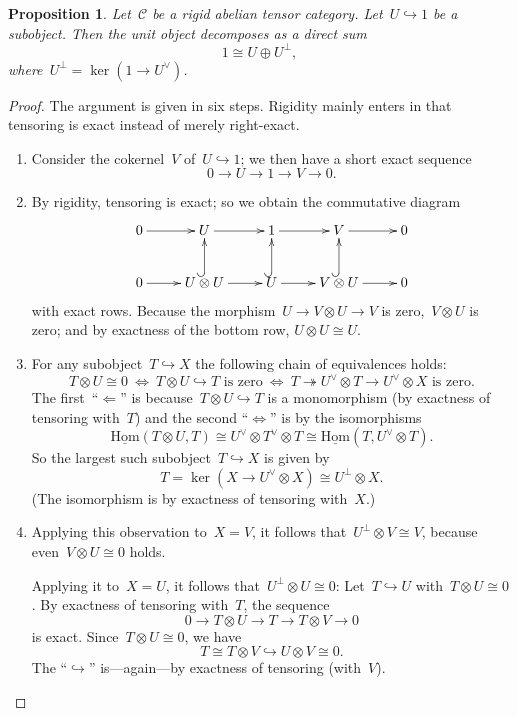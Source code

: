 \documentclass[a4paper,english,12pt]{scrartcl}
\theoremstyle{definition}
\theoremstyle{plain}
\newtheorem{prop}[defn]{Proposition}
\theoremstyle{remark}
\newcommand{\C}{\mathcal{C}}
\renewcommand{\_}{\mathpunct{.}\,}
\newcommand{\?}{\,{:}\,}
\newcommand{\Hom}{\underline{\mathrm{Hom}}}
\begin{document}
\begin{prop}Let~$\C$ be a rigid abelian tensor category. Let~$U \hookrightarrow
1$ be a subobject. Then the unit object decomposes as a direct sum
\[ 1 \cong U \oplus U^\perp, \]
where~$U^\perp = \ker(1 \to U^\vee)$.\end{prop}
\begin{proof}The argument is given in six steps. Rigidity mainly enters in that
tensoring is exact instead of merely right-exact.\begin{enumerate}
\item Consider the cokernel~$V$ of~$U \hookrightarrow 1$; we then have a short
exact sequence
\[ 0 \longrightarrow U \longrightarrow 1 \longrightarrow V \longrightarrow 0.
\]
\item By rigidity, tensoring is exact; so we obtain the commutative diagram
\[ \xymatrix{
  0 \ar[r] & U \ar[r] & 1 \ar[r] & V \ar[r] & 0 \\
  0 \ar[r] & U \otimes U \ar[r] \ar@{^{(}->}[u] & U \ar[r] \ar@{^{(}->}[u] & V \otimes U \ar[r]
  \ar@{^{(}->}[u] & 0
} \]
with exact rows. Because the morphism~$U \to V \otimes U \to V$ is zero,~$V
\otimes U$ is zero; and by exactness of the bottom row, $U \otimes U \cong U$.
\item For any subobject~$T \hookrightarrow X$ the following chain of
equivalences holds:
\[ T \otimes U \cong 0
  \ \Longleftrightarrow\ 
  \text{$T \otimes U \hookrightarrow T$ is zero}
  \ \Longleftrightarrow\ 
  \text{$T \twoheadrightarrow U^\vee \otimes T \to U^\vee \otimes X$ is zero}.
  \]
The first~``$\Leftarrow$'' is because~$T \otimes U \hookrightarrow T$ is a
monomorphism (by exactness of tensoring with~$T$) and the second
``$\Leftrightarrow$'' is by the isomorphisms
\[ \Hom(T \otimes U, T) \cong U^\vee \otimes T^\vee \otimes T \cong
  \Hom(T, U^\vee \otimes T). \]
So the largest such subobject~$T \hookrightarrow X$ is given by
\[ T = \ker(X \to U^\vee \otimes X) \cong U^\perp \otimes X. \]
(The isomorphism is by exactness of tensoring with~$X$.)
\item Applying this observation to~$X = V$, it follows that~$U^\perp \otimes V
\cong V$, because even~$V \otimes U \cong 0$ holds.

Applying it to~$X = U$, it follows that~$U^\perp \otimes U \cong 0$: Let~$T
\hookrightarrow U$ with~$T \otimes U \cong 0$. By exactness of tensoring
with~$T$, the sequence
\[ 0 \longrightarrow T \otimes U \longrightarrow T \longrightarrow T \otimes V
\longrightarrow 0 \]
is exact. Since~$T \otimes U \cong 0$, we have
\[ T \cong T \otimes V \hookrightarrow U \otimes V \cong 0. \]
The ``$\hookrightarrow$'' is---again---by exactness of tensoring (with~$V$).


\end{enumerate}
\end{proof}
\end{document}
